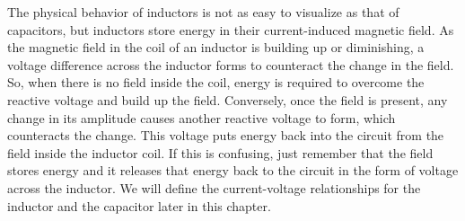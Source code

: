 \par
The physical behavior of inductors is not as easy to visualize as that of capacitors, but inductors store energy in their current-induced magnetic field. As the magnetic field in the coil of an inductor is building up or diminishing, a voltage difference across the inductor forms to counteract the change in the field. So, when there is no field inside the coil, energy is required to overcome the reactive voltage and build up the field. Conversely, once the field is present, any change in its amplitude causes another reactive voltage to form, which counteracts the change. This voltage puts energy back into the circuit from the field inside the inductor coil. If this is confusing, just remember that the field stores energy and it releases that energy back to the circuit in the form of voltage across the inductor. We will define the current-voltage relationships for the inductor and the capacitor later in this chapter.

